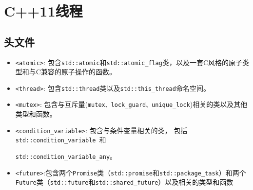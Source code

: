 \documentclass[UTF8,a4paper,12pt]{ctexbook}
\begin{document}
\section{C++11线程}
	\subsection{头文件}
		\begin{itemize}
			\item \verb|<atomic>|: 包含\verb|std::atomic|和\verb|std::atomic_flag|类，以及一套C风格的原子类型和与C兼容的原子操作的函数。
			\item \verb|<thread>|: 包含\verb|std::thread|类以及\verb|std::this_thread|命名空间。
			\item \verb|<mutex>|: 包含与互斥量(\verb|mutex、lock_guard、unique_lock|)相关的类以及其他类型和函数。
			\item \verb|<condition_variable>|: 包含与条件变量相关的类， 包括\verb|std::condition_variable |和
			
			 \verb|std::condition_variable_any|。
			\item \verb|<future>|:包含两个\verb|Promise|类（\verb|std::promise|和\verb|std::package_task|）和两个\verb|Future|类（\verb|std::future|和\verb|std::shared_future|）以及相关的类型和函数
		\end{itemize}
\end{document}
